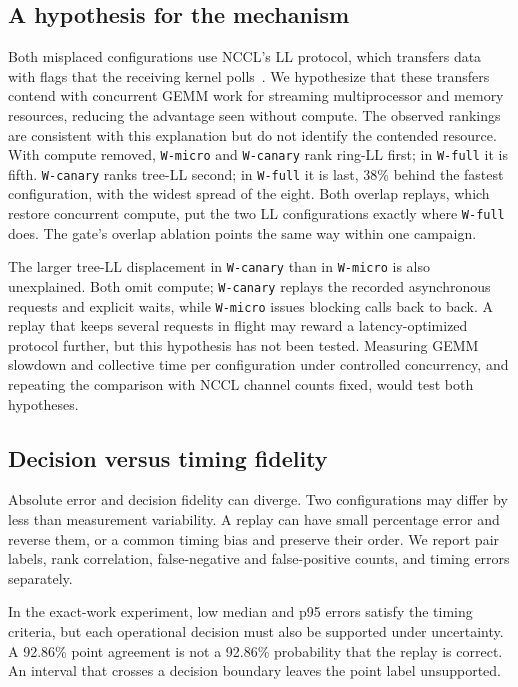 \documentclass[10pt,twocolumn]{article}
\newcommand{\wname}[1]{\texttt{W-#1}}
\begin{document}
\subsection{A hypothesis for the mechanism}

Both misplaced configurations use NCCL's LL protocol, which transfers data
with flags that the receiving kernel polls~\cite{nccl}. We hypothesize that
these transfers contend with concurrent GEMM work for streaming multiprocessor
and memory resources, reducing the advantage seen without compute. The
observed rankings are consistent with this explanation but do not identify
the contended resource. With compute removed,
\wname{micro} and \wname{canary} rank ring-LL first; in \wname{full} it is
fifth. \wname{canary} ranks tree-LL second; in \wname{full} it is last, 38\%
behind the fastest configuration, with the widest spread of the eight. Both
overlap replays, which restore concurrent compute, put the two LL
configurations exactly where \wname{full} does. The gate's overlap ablation
points the same way within one campaign.

The larger tree-LL displacement in \wname{canary} than in \wname{micro} is
also unexplained. Both omit compute; \wname{canary} replays the recorded
asynchronous requests and explicit waits, while \wname{micro} issues blocking calls back to
back. A replay that keeps several requests in flight may reward a
latency-optimized protocol further, but this hypothesis has not been tested.
Measuring GEMM slowdown and collective time per configuration under controlled concurrency,
and repeating the comparison with NCCL channel counts fixed, would test both
hypotheses.

\subsection{Decision versus timing fidelity}

Absolute error and decision fidelity can diverge. Two configurations may differ
by less than measurement variability. A replay can have small percentage error
and reverse them, or a common timing bias and preserve their order. We report
pair labels, rank correlation, false-negative and false-positive counts, and
timing errors separately.

In the exact-work experiment, low median and p95 errors satisfy the timing
criteria, but each operational decision must also be supported under
uncertainty. A 92.86\% point agreement is not a 92.86\% probability that
the replay is correct. An interval that crosses a decision boundary leaves
the point label unsupported.
\end{document}
